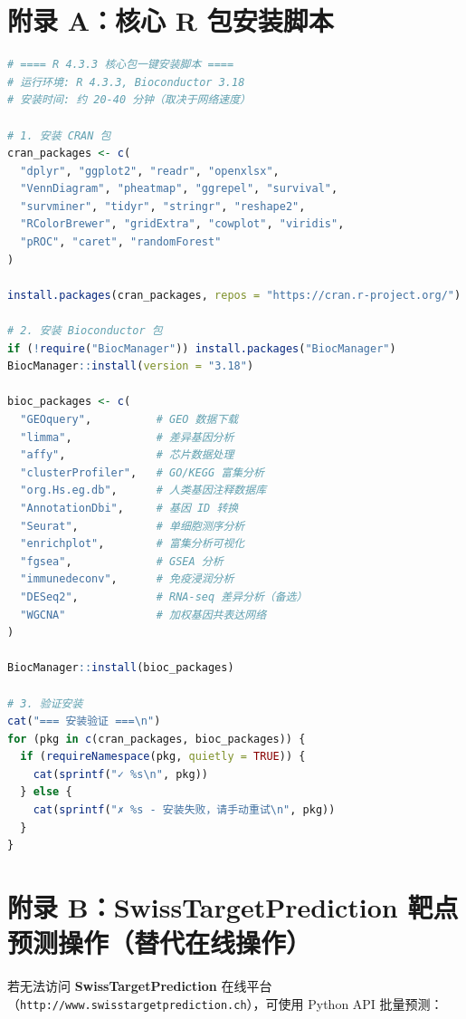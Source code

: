 \documentclass[12pt,a4paper,twoside]{article}
\newcommand{\database}[1]{\textbf{\textsf{#1}}}
\begin{document}
\clearpage

\appendix
\section{附录 A：核心 R 包安装脚本}
\label{appendix:r_packages}

\begin{lstlisting}[language=R,caption={R 4.3.3 核心包一键安装脚本}]
# ==== R 4.3.3 核心包一键安装脚本 ====
# 运行环境: R 4.3.3, Bioconductor 3.18
# 安装时间: 约 20-40 分钟（取决于网络速度）

# 1. 安装 CRAN 包
cran_packages <- c(
  "dplyr", "ggplot2", "readr", "openxlsx",
  "VennDiagram", "pheatmap", "ggrepel", "survival",
  "survminer", "tidyr", "stringr", "reshape2",
  "RColorBrewer", "gridExtra", "cowplot", "viridis",
  "pROC", "caret", "randomForest"
)

install.packages(cran_packages, repos = "https://cran.r-project.org/")

# 2. 安装 Bioconductor 包
if (!require("BiocManager")) install.packages("BiocManager")
BiocManager::install(version = "3.18")

bioc_packages <- c(
  "GEOquery",          # GEO 数据下载
  "limma",             # 差异基因分析
  "affy",              # 芯片数据处理
  "clusterProfiler",   # GO/KEGG 富集分析
  "org.Hs.eg.db",      # 人类基因注释数据库
  "AnnotationDbi",     # 基因 ID 转换
  "Seurat",            # 单细胞测序分析
  "enrichplot",        # 富集分析可视化
  "fgsea",             # GSEA 分析
  "immunedeconv",      # 免疫浸润分析
  "DESeq2",            # RNA-seq 差异分析（备选）
  "WGCNA"              # 加权基因共表达网络
)

BiocManager::install(bioc_packages)

# 3. 验证安装
cat("=== 安装验证 ===\n")
for (pkg in c(cran_packages, bioc_packages)) {
  if (requireNamespace(pkg, quietly = TRUE)) {
    cat(sprintf("✓ %s\n", pkg))
  } else {
    cat(sprintf("✗ %s - 安装失败，请手动重试\n", pkg))
  }
}
\end{lstlisting}

\section{附录 B：SwissTargetPrediction 靶点预测操作（替代在线操作）}
\label{appendix:stp}

若无法访问 \database{SwissTargetPrediction} 在线平台（\texttt{http://www.swisstargetprediction.ch}），可使用 Python API 批量预测：
\end{document}
